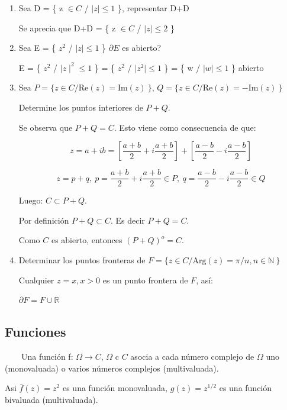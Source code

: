 \documentclass[a4paper,12pt]{article}
\begin{document}
\begin{enumerate}
A+B es abierto.

   \item Sea D = \{ z \(\in C\) / \(\mid z \mid \leq 1\) \}, representar D+D

Se aprecia que D+D = \{ z \(\in C\) / \(\mid z \mid \leq 2\) \}

   \item Sea E = \{ $z^2$ / \(\mid z \mid \leq 1\) \} \(\partial E\) es abierto?

E = \{ $z^2$ / \(\mid z \mid^2 \leq 1\) \} = \{ $z^2$ / \(\mid z^2 \mid \leq 1\) \} = \{ w / \(\mid w \mid \leq 1\) \} abierto


   \item Sea \(P = \{ z \in C / \text{Re}(z) = \text{Im}(z) \ \}\), \(Q = \{ z \in C / \text{Re}(z) = -\text{Im}(z) \ \}\)

Determine los puntos interiores de \(P + Q\).

Se observa que \(P + Q = C\). Esto viene como consecuencia de que:

\[ z = a + ib = \left[ \frac{a+b}{2} + i \frac{a+b}{2} \right] + \left[ \frac{a-b}{2} - i \frac{a-b}{2} \right] \]

\[ z = p + q, \ p = \frac{a+b}{2} + i \frac{a+b}{2} \in P, \ q = \frac{a-b}{2} - i \frac{a-b}{2} \in Q \]

Luego: \(C \subset P + Q\).

Por definición \(P + Q \subset C\). Es decir \(P + Q = C\).

Como \(C\) es abierto, entonces \((P + Q)^o = C\).

   \item Determinar los puntos fronteras de \(F = \{ z \in C / \text{Arg}(z) = \pi/n, n \in \mathbb{N} \ \}\)

Cualquier \(z = x, x > 0\) es un punto frontera de \(F\), así:

\(\partial F = F \cup \mathbb{R}\)


\end{enumerate}

\newpage

\subsection{Funciones}
 \ \ \ \
 Una función f: \(\Omega \rightarrow C\), \(\Omega\) c \(C\) asocia a cada número complejo de \(\Omega\) uno (monovaluada) o varios números complejos (multivaluada).

Asi \(\bar{f}(z) = z^2\) es una función monovaluada, \(g(z) = z^{1/2}\) es una función bivaluada (multivaluada).
\end{document}
